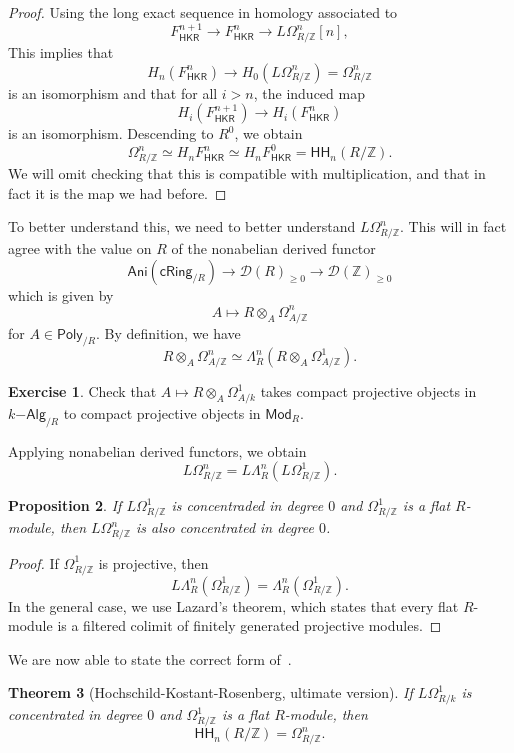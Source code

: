 \documentclass[10pt]{amsart}
\newtheorem{thm}{Theorem}[subsection]
\newtheorem{prop}[thm]{Proposition}
\theoremstyle{definition}
\newtheorem{exer}[thm]{Exercise}
\theoremstyle{remark}
\theoremstyle{plain}
\theoremstyle{definition}
\theoremstyle{remark}
\newcommand{\Z}{\mathbb{Z}}
\newcommand{\mc}[1]{\mathcal{#1}}
\newcommand{\ms}[1]{\mathsf{#1}}
\newcommand{\1}{\mathbf{1}}
\newcommand{\2}{\mathbf{2}}
\newcommand{\3}{\mathbf{3}}
\newcommand{\HH}{\ms{HH}}
\begin{document}
\begin{proof}
    Using the long exact sequence in homology associated to
    \[ F_{\ms{HKR}}^{n+1} \to F_{\ms{HKR}}^n \to L\Omega^n_{R/\Z}[n], \]
    This implies that
    \[ H_n (F^n_{\ms{HKR}}) \to H_0(L\Omega^n_{R/\Z}) = \Omega^n_{R/\Z} \]
    is an isomorphism and that for all $i > n$, the induced map
    \[ H_i(F^{n+1}_{\ms{HKR}}) \to H_i(F^n_{\ms{HKR}}) \]
    is an isomorphism. Descending to $R^0$, we obtain
    \[ \Omega^n_{R/\Z} \simeq H_n F_{\ms{HKR}}^n \simeq H_n F^0_{\ms{HKR}} = \HH_n(R/\Z). \]
    We will omit checking that this is compatible with multiplication, and that in fact it is the map we had before.
\end{proof}

To better understand this, we need to better understand $L\Omega^n_{R/\Z}$. This will in fact agree with the value on $R$ of the nonabelian derived functor
\[ \ms{Ani}(\ms{cRing}_{/R}) \to \mc{D}(R)_{\geq 0} \to \mc{D}(\Z)_{\geq 0} \]
which is given by
\[ A \mapsto R \otimes_A \Omega_{A/\Z}^n \]
for $A \in \ms{Poly}_{/R}$. By definition, we have
\[ R \otimes_A \Omega^n_{A/\Z} \simeq \Lambda_R^n (R \otimes_A \Omega^1_{A/\Z}). \]
\begin{exer}
    Check that $A \mapsto R \otimes_A \Omega^1_{A/k}$ takes compact projective objects in $k\ms{-Alg}_{/R}$ to compact projective objects in $\ms{Mod}_R$.
\end{exer}
Applying nonabelian derived functors, we obtain
\[ L\Omega^n_{R/\Z} = L \Lambda^n_R (L \Omega^1_{R/\Z}). \]

\begin{prop}
    If $L\Omega^1_{R/\Z}$ is concentraded in degree $0$ and $\Omega^1_{R/\Z}$ is a flat $R$-module, then $L\Omega^n_{R/\Z}$ is also concentrated in degree $0$.
\end{prop}

\begin{proof}
    If $\Omega^1_{R/\Z}$ is projective, then
    \[ L \Lambda_R^n (\Omega^1_{R/\Z}) = \Lambda^n_R (\Omega^1_{R/\Z}). \]
    In the general case, we use Lazard's theorem, which states that every flat $R$-module is a filtered colimit of finitely generated projective modules.
\end{proof}

We are now able to state the correct form of~.
\begin{thm}[Hochschild-Kostant-Rosenberg, ultimate version]\label{thm:hkr2}
    If $L\Omega^1_{R/k}$ is concentrated in degree $0$ and $\Omega^1_{R/\Z}$ is a flat $R$-module, then
    \[ \HH_n(R/\Z) = \Omega^n_{R/\Z}. \]
\end{thm}
\end{document}
